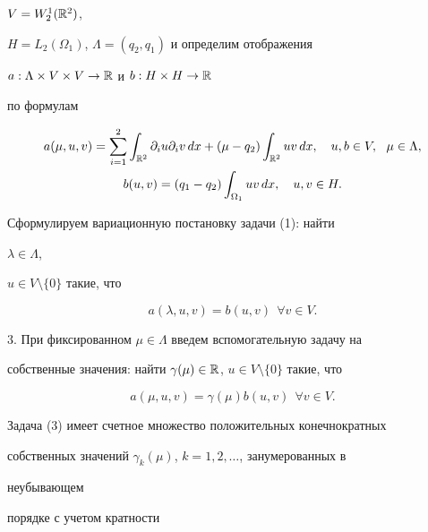 $V=W^1_2(\Bbb R^2)$, 


$H=L_2(\Omega_1)$, $\Lambda=(q_2,q_1)$ и определим отображения 


$a:\Lambda\times V\times V\to\Bbb R$ и $b:H\times H\to\Bbb R$ 


по формулам 


\begin{gather*} 


a(\mu,u,v)=\sum^2_{i=1}\int_{\Bbb R^2}\partial_i u 


\partial_i v\,dx+(\mu-q_2)\int_{\Bbb R^2}u v\,dx,\quad 


u,b\in V,\ \ \mu\in\Lambda, \\ 


% 


b(u,v)=(q_1-q_2)\int_{\Omega_1}u v\,dx,\quad u,v\in H. 


\end{gather*} 


 


Сформулируем вариационную постановку задачи (1): найти 


$\lambda\in\Lambda$, 


$u\in V\setminus\{0\}$ такие, что 


\begin{equation} 


a(\lambda,u,v)=b(u,v)\ \ \forall v\in V. 


\end{equation} 


 


3. При фиксированном $\mu\in\Lambda$ введем вспомогательную задачу на 


собственные значения: найти $\gamma(\mu)\in\Bbb R$, $u\in 


V\setminus\{0\}$ такие, что 


\begin{equation} 


a(\mu,u,v)=\gamma(\mu)b(u,v)\ \ \forall v\in V. 


\end{equation} 


Задача (3) имеет счетное множество положительных конечнократных 


собственных значений $\gamma_k(\mu)$, $k=1,2,\dotsc$, занумерованных в 


неубывающем 


порядке с учетом кратности 


$$ 


